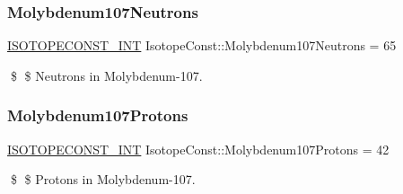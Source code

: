 \subsubsection{\texorpdfstring{Molybdenum107\+Neutrons}{Molybdenum107Neutrons}}
{\footnotesize\ttfamily \mbox{\hyperlink{group___isotope_const-_macros_ga5f18360b3e99483a35c32d789e62621c}{I\+S\+O\+T\+O\+P\+E\+C\+O\+N\+S\+T\+\_\+\+I\+NT}} Isotope\+Const\+::\+Molybdenum107\+Neutrons = 65}

\$ \$ Neutrons in Molybdenum-\/107. \mbox{\label{group___isotope_const-_molybdenum-_mo107_ga1947354d594984c3bb7ee34d94d8aad6}} 
\subsubsection{\texorpdfstring{Molybdenum107\+Protons}{Molybdenum107Protons}}
{\footnotesize\ttfamily \mbox{\hyperlink{group___isotope_const-_macros_ga5f18360b3e99483a35c32d789e62621c}{I\+S\+O\+T\+O\+P\+E\+C\+O\+N\+S\+T\+\_\+\+I\+NT}} Isotope\+Const\+::\+Molybdenum107\+Protons = 42}

\$ \$ Protons in Molybdenum-\/107. 